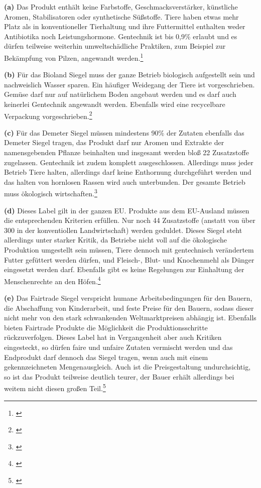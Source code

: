 \textbf{(a)} Das Produkt enthält keine Farbstoffe, Geschmacksverstärker, künstliche Aromen, Stabilisatoren oder synthetische Süßstoffe. Tiere haben etwas mehr Platz als in konventioneller Tierhaltung und ihre Futtermittel enthalten weder Antibiotika noch Leistungshormone. Gentechnik ist bis 0,9\% erlaubt und es dürfen teilweise weiterhin umweltschädliche Praktiken, zum Beispiel zur Bekämpfung von Pilzen, angewandt werden.\footnote{\cite{egoeko}}

\noindent\textbf{(b)} Für das Bioland Siegel muss der ganze Betrieb biologisch aufgestellt sein und nachweislich Wasser sparen. Ein häufiger Weidegang der Tiere ist vorgeschrieben. Gemüse darf nur auf natürlichem Boden angebaut werden und es darf auch keinerlei Gentechnik angewandt werden. Ebenfalls wird eine recycelbare Verpackung vorgeschrieben.\footnote{\cite{verschiedenelabel}}

\noindent\textbf{(c)} Für das Demeter Siegel müssen mindestens 90\% der Zutaten ebenfalls das Demeter Siegel tragen, das Produkt darf nur Aromen und Extrakte der namensgebenden Pflanze beinhalten und insgesamt werden bloß 22 Zusatzstoffe zugelassen. Gentechnik ist zudem komplett ausgeschlossen. Allerdings muss jeder Betrieb Tiere halten, allerdings darf keine Enthornung durchgeführt werden und das halten von hornlosen Rassen wird auch unterbunden. Der gesamte Betrieb muss ökologisch wirtschaften.\footnote{\cite{verschiedenelabel}}

\noindent\textbf{(d)} Dieses Label gilt in der ganzen EU. Produkte aus dem EU-Ausland müssen die entsprechenden Kriterien erfüllen. Nur noch 44 Zusatzstoffe (anstatt von über 300 in der konventiollen Landwirtschaft) werden geduldet. Dieses Siegel steht allerdings unter starker Kritik, da Betriebe nicht voll auf die ökologische Produktion umgestellt sein müssen, Tiere dennoch mit gentechnisch verändertem Futter gefüttert werden dürfen, und Fleisch-, Blut- und Knochenmehl als Dünger eingesetzt werden darf. Ebenfalls gibt es keine Regelungen zur Einhaltung der Menschenrechte an den Höfen.\footnote{\cite{verschiedenelabel}}

\noindent\textbf{(e)} Das Fairtrade Siegel verspricht humane Arbeitsbedingungen für den Bauern, die Abschaffung von Kinderarbeit, und feste Preise für den Bauern, sodass dieser nicht mehr von den stark schwankenden Weltmarktpreisen abhängig ist. Ebenfalls bieten Fairtrade Produkte die Möglichkeit die Produktionsschritte rückzuverfolgen. Dieses Label hat in Vergangenheit aber auch Kritiken eingesteckt, so dürfen faire und unfaire Zutaten vermischt werden und das Endprodukt darf dennoch das Siegel tragen, wenn auch mit einem gekennzeichneten Mengenausgleich. Auch ist die Preisgestaltung undurchsichtig, so ist das Produkt teilweise deutlich teurer, der Bauer erhält allerdings bei weitem nicht diesen großen Teil.\footnote{\cite{fairtrade}}

